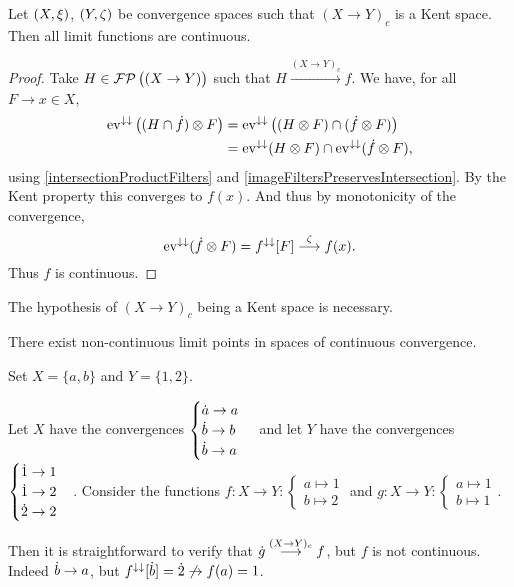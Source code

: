 \begin{lemma}
Let $\left( X,\xi \right)$, $\left( Y,\zeta \right)$ be convergence spaces such that $(X\to Y)_c$ is a Kent space. Then all limit functions are continuous.
\end{lemma}
\begin{proof}
Take $H\in\operatorname{\mathcal{FP}}\big((X\to Y)\big)$ such that $H\overset{(X\to Y)_c}{\longrightarrow} f$. We have, for all $F\to x\in X$,
\begin{align*}
\operatorname{ev}^{\downarrow\downarrow}\big((H\cap \dot{f})\otimes F\big) &= \operatorname{ev}^{\downarrow\downarrow}\big((H \otimes F) \cap (\dot{f} \otimes F)\big) \\
&= \operatorname{ev}^{\downarrow\downarrow}(H \otimes F) \cap \operatorname{ev}^{\downarrow\downarrow}(\dot{f} \otimes F),
\end{align*} 
using \ref{intersectionProductFilters} and \ref{imageFiltersPreservesIntersection}. By the Kent property this converges to $f(x)$. And thus by monotonicity of the convergence,
\[ \operatorname{ev}^{\downarrow\downarrow}(\dot{f} \otimes F) = f^{\downarrow\downarrow}[F] \overset{\zeta}{\longrightarrow} f(x). \]
Thus $f$ is continuous.
\end{proof}
The hypothesis of $(X\to Y)_c$ being a Kent space is necessary.
\begin{example}
There exist non-continuous limit points in spaces of continuous convergence.

Set $X = \{a,b\}$ and $Y = \{1,2\}$.

Let $X$ have the convergences $\begin{cases}
\dot{a} \to a \\
\dot{b} \to b \\
\dot{b} \to a
\end{cases}$ and let $Y$ have the convergences $\begin{cases}
\dot{1} \to 1 \\
\dot{1} \to 2 \\
\dot{2} \to 2
\end{cases}$.
Consider the functions $f: X\to Y: \begin{cases}
a\mapsto 1 \\ b\mapsto 2
\end{cases}$ and $g: X\to Y: \begin{cases}
a\mapsto 1 \\ b\mapsto 1
\end{cases}$.

Then it is straightforward to verify that $\dot{g} \overset{(X\to Y)_c}{\longrightarrow} f$, but $f$ is not continuous. Indeed $\dot{b} \to a$, but $f^{\downarrow\downarrow}[\dot{b}] = \dot{2} \not\to f(a) = 1$.
\end{example}

